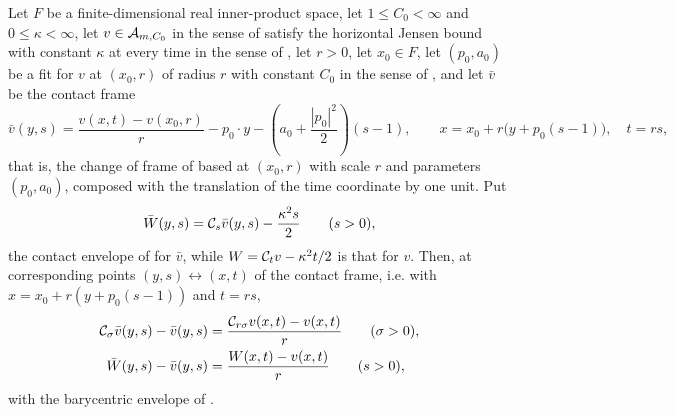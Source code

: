 \begin{lemma}
Let $F$ be a finite-dimensional real inner-product space, let
$1\le C_0<\infty$ and $0\le\kappa<\infty$, let $v\in\mathcal{A}_{m,C_0}$ in the sense
of  satisfy the horizontal Jensen bound with constant
$\kappa$ at every time in the sense of , let $r>0$, let
$x_0\in F$, let $(p_0,a_0)$ be a fit for $v$ at $(x_0,r)$ of radius $r$ with
constant $C_0$ in the sense of , and let $\bar v$ be the contact
frame
\[
  \bar v(y,s)=\frac{v(x,t)-v(x_0,r)}{r}
          -p_0\cdot y-\left(a_0+\frac{|p_0|^2}{2}\right)(s-1),
  \qquad x=x_0+r\bigl(y+p_0(s-1)\bigr),\quad t=rs,
\]
that is, the change of frame of  based at $(x_0,r)$ with
scale $r$ and parameters $(p_0,a_0)$, composed with the translation of the time
coordinate by one unit. Put
\[
  \bar W(y,s)=\mathcal{C}_s\bar v(y,s)-\frac{\kappa^2s}{2}\qquad(s>0),
\]
the contact envelope of  for $\bar v$, while
$W=\mathcal{C}_tv-\kappa^2t/2$ is that for $v$. Then, at corresponding points
$(y,s)\leftrightarrow(x,t)$ of the contact frame, i.e. with
$x=x_0+r(y+p_0(s-1))$ and $t=rs$,
\begin{equation}\label{eq:contact-W-covariance}
\begin{split}
  \mathcal{C}_\sigma\bar v(y,s)-\bar v(y,s)
       &=\frac{\mathcal{C}_{r\sigma}v(x,t)-v(x,t)}{r}\qquad(\sigma>0),\\
  \bar W(y,s)-\bar v(y,s)&=\frac{W(x,t)-v(x,t)}{r}
       \qquad(s>0),
\end{split}
\end{equation}
with the barycentric envelope of .
\end{lemma}
